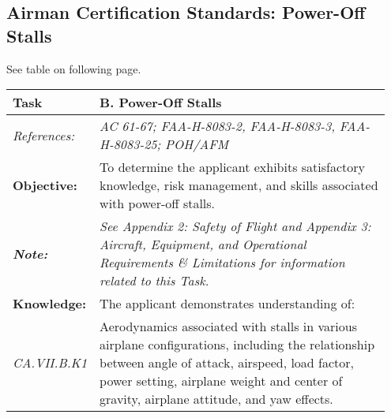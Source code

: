 \subsection{Airman Certification Standards: Power-Off Stalls}

See table on following page.

\begin{table}[]
\begin{tabular}%
  {>{\raggedleft\arraybackslash}p{0.15\linewidth}%
   >{\raggedright\arraybackslash}p{0.8\linewidth}%
  }
\textbf{Task}                                                       & \textbf{B. Power-Off Stalls}                                                                                                                                                                                                                 \\ \hline
\textit{References:}                                                & \textit{AC 61-67; FAA-H-8083-2, FAA-H-8083-3, FAA-H-8083-25; POH/AFM}                                                                                                                                                                        \\
\textbf{Objective:}                                                 & To determine the applicant exhibits satisfactory knowledge, risk management, and skills associated with power-off stalls.                                                                                                                    \\
\textit{\textbf{Note:}}                                             & \textit{See Appendix 2: Safety of Flight and Appendix 3: Aircraft, Equipment, and Operational Requirements \& Limitations for information related to this Task.}                                                                             \\ \hline
\textbf{Knowledge:}                                                 & The applicant demonstrates understanding of:                                                                                                                                                                                                 \\
\textit{CA.VII.B.K1}                                                & Aerodynamics associated with stalls in various airplane configurations, including the relationship between angle of attack, airspeed, load factor, power setting, airplane weight and center of gravity, airplane attitude, and yaw effects. \\

\end{tabular}
\end{table}
